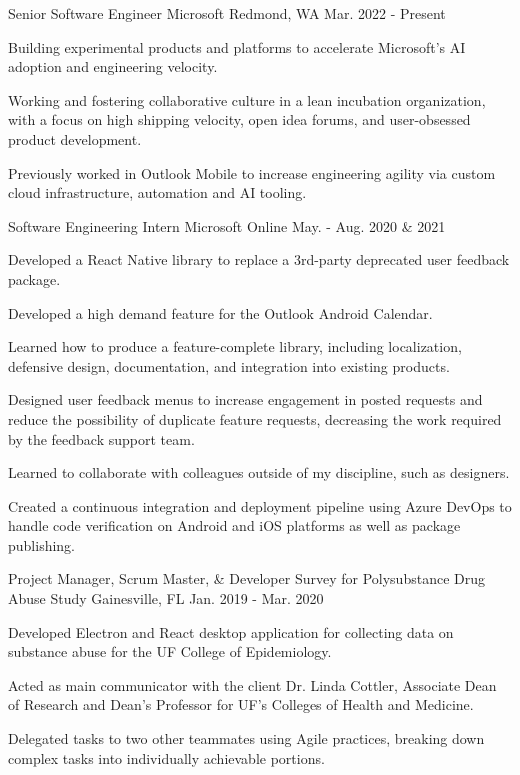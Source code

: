 \begin{cventries}
  \cventry
    {Senior Software Engineer}
    {Microsoft}
    {Redmond, WA}
    {Mar. 2022 - Present}
    {
      \begin{cvitems}
        \item{Building experimental products and platforms to accelerate Microsoft's AI adoption and engineering velocity.}
        \item{Working and fostering collaborative culture in a lean incubation organization, with a focus on high shipping velocity, open idea forums, and user-obsessed product development.}
        \item{Previously worked in Outlook Mobile to increase engineering agility via custom cloud infrastructure, automation and AI tooling.}
      \end{cvitems}
    }
  \cventry
    {Software Engineering Intern}
    {Microsoft}
    {Online}
    {May. - Aug. 2020 \& 2021}
    {
      \begin{cvitems}
        \item{Developed a React Native library to replace a 3rd-party deprecated user feedback package.}
        \item{Developed a high demand feature for the Outlook Android Calendar.}
        \item{Learned how to produce a feature-complete library, including localization, defensive design, documentation, and integration into existing products.}
        \item{Designed user feedback menus to increase engagement in posted requests and reduce the possibility of duplicate feature requests, decreasing the work required by the feedback support team.}
        \item{Learned to collaborate with colleagues outside of my discipline, such as designers.}
        \item{Created a continuous integration and deployment pipeline using Azure DevOps to handle code verification on Android and iOS platforms as well as package publishing.}
      \end{cvitems}
    }
  \cventry
    {Project Manager, Scrum Master, \& Developer}
    {Survey for Polysubstance Drug Abuse Study}
    {Gainesville, FL}
    {Jan. 2019 - Mar. 2020}
    {
      \begin{cvitems}
        \item {Developed Electron and React desktop application for collecting data on substance abuse for the UF College of Epidemiology.}
        \item {Acted as main communicator with the client Dr. Linda Cottler, Associate Dean of Research and Dean's Professor for UF's Colleges of Health and Medicine.}
        \item {Delegated tasks to two other teammates using Agile practices, breaking down complex tasks into individually achievable portions.}
      \end{cvitems}
    }
\end{cventries}
